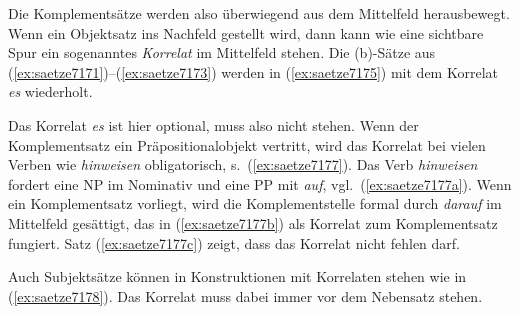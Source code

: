 Die Komplementsätze werden also überwiegend aus dem Mittelfeld herausbewegt.
Wenn ein Objektsatz ins Nachfeld gestellt wird, dann kann wie eine sichtbare Spur ein sogenanntes \textit{Korrelat} im Mittelfeld stehen.
Die (b)-Sätze aus (\ref{ex:saetze7171})--(\ref{ex:saetze7173}) werden in (\ref{ex:saetze7175}) mit dem Korrelat \textit{es} wiederholt.

\begin{exe}
  \ex\label{ex:saetze7175}
  \begin{xlist}
  \end{xlist}
\end{exe}

Das Korrelat \textit{es} ist hier optional, muss also nicht stehen.
Wenn der Komplementsatz ein Präpositionalobjekt vertritt, wird das Korrelat bei vielen Verben wie \textit{hinweisen} obligatorisch, s.\ (\ref{ex:saetze7177}).
Das Verb \textit{hinweisen} fordert eine NP im Nominativ und eine PP mit \textit{auf}, vgl.\ (\ref{ex:saetze7177a}).
Wenn ein Komplementsatz vorliegt, wird die Komplementstelle formal durch \textit{darauf} im Mittelfeld gesättigt, das in (\ref{ex:saetze7177b}) als Korrelat zum Komplementsatz fungiert.
Satz (\ref{ex:saetze7177c}) zeigt, dass das Korrelat nicht fehlen darf.

\begin{exe}
  \ex\label{ex:saetze7177}
  \begin{xlist}
  \end{xlist}
\end{exe}

Auch Subjektsätze können in Konstruktionen mit Korrelaten stehen wie in (\ref{ex:saetze7178}).
Das Korrelat muss dabei immer vor dem Nebensatz stehen.

\begin{exe}
  \ex\label{ex:saetze7178}
  \begin{xlist}
  \end{xlist}
\end{exe}

